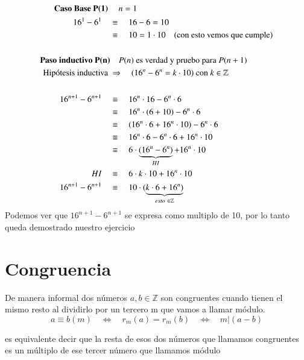 \documentclass[12pt]{book}
\begin{document}
\begin{equation*}
\begin{split}
\textbf{Caso Base P(1) } & \quad n=1 \\
16^{1} - 6^{1} \quad   &\equiv \quad  16 - 6 = 10 \\
&\equiv \quad  10 = 1 \cdot 10 \text{\quad (con esto vemos que cumple)}\\ \\
\textbf{Paso inductivo P(n)} & \quad P(n) \text { es verdad y pruebo para } P(n+1)	\\
\text{Hip\'otesis inductiva } &\Rightarrow \quad (16^{n} - 6^{n} = k \cdot 10) \text{ con } k \in \mathbb{Z}\\ \\
16^{n+1} - 6^{n+1} \quad &\equiv  \quad   16^{n} \cdot 16 - 6^{n} \cdot 6  \\
&\equiv  \quad   16^{n} \cdot (6+10) - 6^{n} \cdot 6  \\
&\equiv  \quad   (16^{n} \cdot 6 + 16^{n} \cdot10) - 6^{n} \cdot 6  \\
&\equiv  \quad    16^{n} \cdot 6 - 6^{n} \cdot 6  +  16^{n} \cdot 10 \\
&\equiv  \quad   6 \cdot \underbrace{ (16^{n} - 6^{n}) }_{HI}  +  16^{n} \cdot 10 \\
HI \quad   &\equiv  \quad  6 \cdot k \cdot 10 + 16^{n} \cdot 10 \\
16^{n+1} - 6^{n+1} \quad  &\equiv  \quad  10 \cdot (\underbrace{  k \cdot 6 + 16^{n})}_{ esto \ \in \mathbb{Z}}  
\end{split}
\end{equation*}
Podemos ver que $ 16^{n+1} - 6^{n+1} $ se expresa como multiplo de 10, por lo tanto queda demostrado nuestro ejercicio


\chapter{Congruencia}

De manera informal dos números $a,b \in \mathbb{Z}$ son congruentes cuando tienen el mismo resto al dividirlo por un tercero m que vamos a llamar módulo.
\begin{equation*}
a \equiv b (m) \quad \Leftrightarrow \quad  r_m(a) = r_m(b) \quad  \Leftrightarrow \quad  m \vert (a-b)
\end{equation*}

es equivalente decir que la resta de esos dos números que llamamos congruentes es un múltiplo de ese tercer número que llamamos módulo
\end{document}
